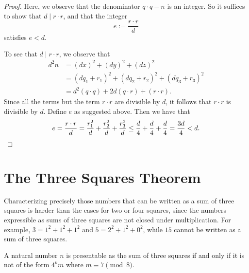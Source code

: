\begin{proof}
  Here, we observe that the denominator $q\cdot q-n$ is an integer. So it suffices to show that $d\mid r\cdot r$, and that the integer
  \begin{equation*}
    e:= \frac{r\cdot r}{d}
  \end{equation*}
  satisfies $e<d$.

  To see that $d\mid r\cdot r$, we observe that
  \begin{align*}
    d^2n &= (dx)^2+(dy)^2+(dz)^2 \\
         &= (dq_1+r_1)^2+(dq_2+r_2)^2+(dq_3+r_3)^2 \\
         &= d^2(q\cdot q)+2d(q\cdot r)+ (r\cdot r).
  \end{align*}
  Since all the terms but the term $r\cdot r$ are divisible by $d$, it follows that $r\cdot r$ is divisible by $d$. Define $e$ as suggested above. Then we have that
  \begin{equation*}
    e=\frac{r\cdot r}{d}=\frac{r_1^2}{d}+\frac{r_2^2}{d}+\frac{r_3^2}{d}\leq \frac{d}{4}+\frac{d}{4}+\frac{d}{4}=\frac{3d}{4}<d.\qedhere
  \end{equation*}
\end{proof}

\section{The Three Squares Theorem}

Characterizing precisely those numbers that can be written as a sum of three squares is harder than the cases for two or four squares, since the numbers expressible as sums of three squares are not closed under multiplication. For example, $3=1^2+1^2+1^2$ and $5=2^2+1^2+0^2$, while $15$ cannot be written as a sum of three squares.

\begin{theorem}
  A natural number $n$ is presentable as the sum of three squares if and only if it is not of the form $4^k m$ where $m\equiv 7\pmod{8}$.
\end{theorem}

